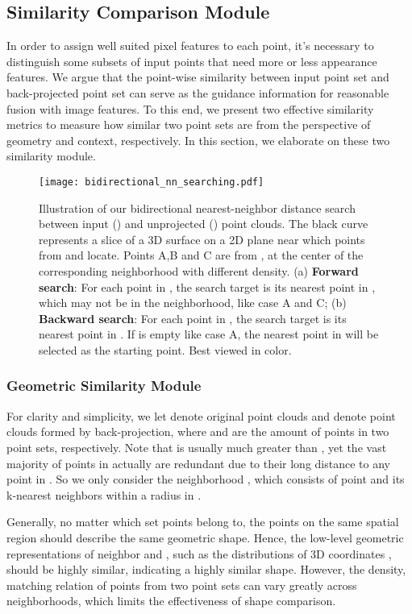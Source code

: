 \documentclass[letterpaper, 10 pt, conference]{ieeeconf}
\begin{document}
\subsection{Similarity Comparison Module}

In order to assign well suited pixel features to each point, it's necessary to distinguish some subsets of input points that need more or less appearance features. We argue that the point-wise similarity between input point set and back-projected point set can serve as the guidance information for reasonable fusion with image features. To this end, we present two effective similarity metrics to measure how similar two point sets are from the perspective of geometry and context, respectively. In this section, we elaborate on these two similarity module.

\begin{figure}[t]
\texttt{[image: bidirectional\_nn\_searching.pdf]}
\vspace{-7mm}
\caption{Illustration of our bidirectional nearest-neighbor distance search between input () and unprojected () point clouds. 
The black curve represents a slice of a 3D surface on a 2D plane near which points from  and  locate. Points A,B and C are from , at the center of the corresponding neighborhood with different density. 
(a) \textbf{Forward search}: For each point in , the search target is its nearest point in , which may not be in the neighborhood, like case A and C; (b) \textbf{Backward search}: For each point in , the search target is its nearest point in . If  is empty like case A, the nearest point in  will be selected as the starting point.
Best viewed in color.} 
\vspace{-7mm}
\end{figure}

\subsubsection{\textbf{Geometric Similarity Module}}

For clarity and simplicity, we let  denote original point clouds and  denote point clouds formed by back-projection, where  and  are the amount of points in two point sets, respectively. Note that  is usually much greater than , yet the vast majority of points in  actually are redundant due to their long distance to any point in . So we only consider the neighborhood , which consists of point  and its k-nearest neighbors within a radius  in .


Generally, no matter which set points belong to, the points on the same spatial region should describe the same geometric shape. Hence, the low-level geometric representations of neighbor  and , such as the distributions of 3D coordinates , should be highly similar, indicating a highly similar shape. However, the density, matching relation of points from two point sets can vary greatly across neighborhoods, which limits the effectiveness of shape comparison. 
\end{document}
